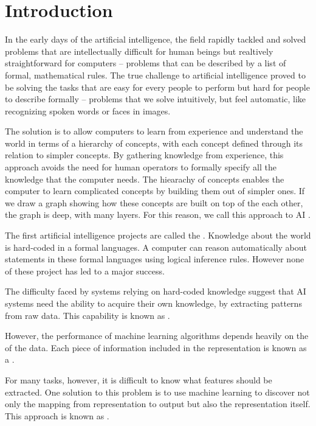 
\chapter{Introduction}

In the early days of the artificial intelligence, the field rapidly tackled  and solved problems that are intellectually difficult for human beings but realtively straightforward for computers -- problems that can be described by a list of formal, mathematical rules.
The true challenge to artificial intelligence proved to be solving the tasks that are easy for every people to perform but hard for people to describe formally -- problems that we solve intuitively, but feel automatic, like recognizing spoken words or faces in images.


The solution is to allow computers to learn from experience and understand the world in terms of a hierarchy of concepts, with each concept defined through its relation to simpler concepts.
By gathering knowledge from experience, this approach avoids the need for human operators to formally specify all the knowledge that the computer needs.
The hiearachy of concepts enables the computer to learn complicated concepts by building them out of simpler ones.
If we draw a graph showing how these concepts are built on top of the each other, the graph is deep, with many layers.
For this reason, we call this approach to AI .


The first artificial intelligence projects are called the .
Knowledge about the world is hard-coded in a formal languages.
A computer can reason automatically about statements in these formal languages using logical inference rules.
However none of these project has led to a major success.


The difficulty faced by systems relying on hard-coded knowledge suggest that AI systems need the ability to acquire their own knowledge, by extracting patterns from raw data. This capability is known as . 

However, the performance of machine learning algorithms depends heavily on the  of the data.
Each piece of information included in the representation is known as a .


For many tasks, however, it is difficult to know what features should be extracted. One solution to this problem is to use machine learning to discover not only the mapping from representation to output but also the representation itself. This approach is known as .



